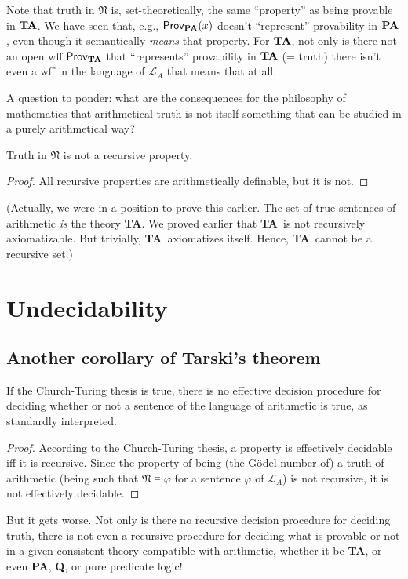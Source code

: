 \documentclass[12pt]{report}
\theoremstyle{nonumberplain}
\newtheorem{proof}{Proof}
\newcommand{\olsf}[1]{\mathsf{#1}}
\newcommand{\Q}{\textbf{\textup{Q}}}
\newcommand{\PA}{\textbf{\textup{PA}}}
\newcommand{\smN}{\mathfrak{N}}
\newcommand{\TA}{\textbf{\textup{TA}}}
\newcommand{\Prov}[1]{\olsf{Prov}_{#1}}
\newcommand{\ProvPA}{\Prov{\PA}}
\begin{document}
\noindent Note that truth in $\smN$ is, set-theoretically, the same ``property'' as being provable in $\TA$. We have seen that, e.g., $\ProvPA(x)$ doesn't ``represent'' provability in $\PA$, even though it semantically \emph{means} that property. For $\TA$, not only is there not an open wff $\Prov{\TA}$ that ``represents'' provability in $\TA$ (= truth) there isn't even a wff in the language of $\mathcal{L}_A$ that means that at all.

A question to ponder: what are the consequences for the philosophy of mathematics that arithmetical truth is not itself something that can be studied in a purely arithmetical way?

\begin{coro}
Truth in $\smN$ is not a recursive property.
\end{coro}
\begin{proof}
All recursive properties are arithmetically definable, but it is not.
\end{proof}
(Actually, we were in a position to prove this earlier. The set of true sentences of arithmetic \emph{is} the theory \TA. We proved earlier that \TA\ is not recursively axiomatizable. But trivially, \TA\ axiomatizes itself. Hence, \TA\ cannot be a recursive set.)

\section{Undecidability}

\subsection*{Another corollary of Tarski's theorem}

\begin{coro}
If the Church-Turing thesis is true, there is no effective decision procedure for deciding whether or not a sentence of the language of arithmetic is true, as standardly interpreted.
\end{coro}
\begin{proof}
According to the Church-Turing thesis, a property is effectively decidable iff it is recursive. Since the property of being (the Gödel number of) a truth of arithmetic (being such that $\smN ⊨ φ$ for a sentence $φ$ of $\mathcal{L}_A$) is not recursive, it is not effectively decidable.
\end{proof}

\noindent But it gets worse. Not only is there no recursive decision procedure for deciding truth, there is not even a recursive procedure for deciding what is provable or not in a given consistent theory compatible with arithmetic, whether it be \TA, or even \PA, \Q, or pure predicate logic!
\end{document}

